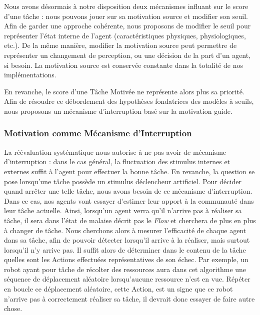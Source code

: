 			Nous avons désormais à notre disposition deux mécanismes influant sur le score d'une tâche : nous pouvons jouer sur sa motivation source et modifier son seuil. Afin de garder une approche cohérente, nous proposons de modifier le seuil pour représenter l'état interne de l'agent (caractéristiques physiques, physiologiques, etc.). De la même manière, modifier la motivation source peut permettre de représenter un changement de perception, ou une décision de la part d'un agent, si besoin. La motivation source est conservée constante dans la totalité de nos implémentations.
			
			En revanche, le score d'une Tâche Motivée ne représente alors plus sa priorité. Afin de résoudre ce débordement des hypothèses fondatrices des modèles à seuils, nous proposons un mécanisme d'interruption basé sur la motivation guide.
			
		\subsubsection{Motivation comme Mécanisme d'Interruption}
		
			La réévaluation systématique nous autorise à ne pas avoir de mécanisme d'interruption : dans le cas général, la fluctuation des stimulus internes et externes suffit à l'agent pour effectuer la bonne tâche. En revanche, la question se pose lorsqu'une tâche possède un stimulus déclencheur artificiel. Pour décider quand arrêter une telle tâche, nous avons besoin de ce mécanisme d'interruption. Dans ce cas, nos agents vont essayer d'estimer leur apport à la communauté dans leur tâche actuelle. Ainsi, lorsqu'un agent verra qu'il n'arrive pas à réaliser sa tâche, il sera dans l'état de malaise décrit pas le \textit{Flow} et cherchera de plus en plus à changer de tâche. Nous cherchons alors à mesurer l'efficacité de chaque agent dans sa tâche, afin de pouvoir détecter lorsqu'il arrive à la réaliser, mais surtout lorsqu'il n'y arrive pas. Il suffit alors de déterminer dans le contenu de la tâche quelles sont les Actions effectuées représentatives de son échec. Par exemple, un robot ayant pour tâche de récolter des ressources aura dans cet algorithme une séquence de déplacement aléatoire lorsqu'aucune ressource n'est en vue. Répéter en boucle ce déplacement aléatoire, cette Action, est un signe que ce robot n'arrive pas à correctement réaliser sa tâche, il devrait donc essayer de faire autre chose.
			
